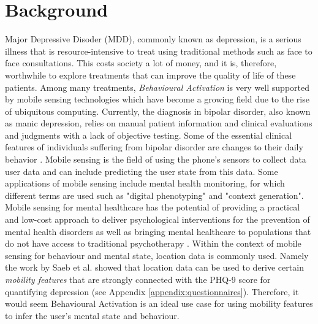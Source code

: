 \section{Background}



Major Depressive Disoder (MDD), commonly known as depression, is a serious illness that is resource-intensive to treat using traditional methods such as face to face consultations. This costs society a lot of money, and it is, therefore, worthwhile to explore treatments that can improve the quality of life of these patients. Among many treatments, \textit{Behavioural Activation} is very well supported by mobile sensing technologies \cite{behavioural_activation_for_depression} which have become a growing field due to the rise of ubiquitous computing. Currently, the diagnosis in bipolar disorder, also known as manic depression, relies on manual patient information and clinical evaluations and judgments with a lack of objective testing. Some of the essential clinical features of individuals suffering from bipolar disorder are changes to their daily behavior \cite{objective_smartphone_data_as_diagnostic_marker}. Mobile sensing is the field of using the phone's sensors to collect data user data and can include predicting the user state from this data. Some applications of mobile sensing include mental health monitoring, for which different terms are used such as "digital phenotyping" and "context generation". Mobile sensing for mental healthcare has the potential of providing a practical and low-cost approach to deliver psychological interventions for the prevention of mental health disorders \cite{mobile-based-interventions} as well as bringing mental healthcare to populations that do not have access to traditional psychotherapy \cite{future-mental-health}. Within the context of mobile sensing for behaviour and mental state, location data is commonly used. Namely the work by Saeb et al. \cite{Saeb2015} showed that location data can be used to derive certain \textit{mobility features} that are strongly connected with the PHQ-9 score for quantifying depression (see Appendix \ref{appendix:questionnaires}). Therefore, it would seem Behavioural Activation is an ideal use case for using mobility features to infer the user's mental state and behaviour. 